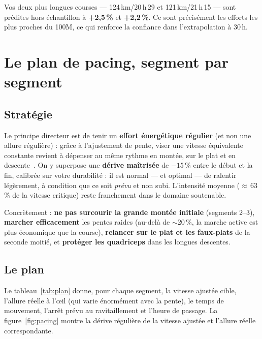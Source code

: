\documentclass{locomotionreport}
\begin{document}
\begin{llexemple}
Vos deux plus longues courses --- 124\,km/20\,h\,29 et 121\,km/21\,h\,15 --- sont pr\'edites hors \'echantillon \`a
\textbf{+2,5\,\%} et \textbf{+2,2\,\%}. Ce sont pr\'ecis\'ement les efforts les plus proches du 100M, ce qui renforce
la confiance dans l'extrapolation \`a 30\,h.
\end{llexemple}

\section{Le plan de pacing, segment par segment}

\subsection{Strat\'egie}
Le principe directeur est de tenir un \textbf{effort \'energ\'etique r\'egulier} (et non une allure r\'eguli\`ere) :
gr\^ace \`a l'ajustement de pente, viser une vitesse \'equivalente constante revient \`a d\'epenser au m\^eme rythme
en mont\'ee, sur le plat et en descente~\cite{swain1997}. On y superpose une \textbf{d\'erive ma\^itris\'ee} de
\(-15\,\%\) entre le d\'ebut et la fin, calibr\'ee sur votre durabilit\'e : il est normal --- et optimal --- de
ralentir l\'eg\`erement, \`a condition que ce soit \emph{pr\'evu} et non subi. L'intensit\'e moyenne ($\approx$\,63\,\%
de la vitesse critique) reste franchement dans le domaine soutenable.

Concr\`etement : \textbf{ne pas surcourir la grande mont\'ee initiale} (segments 2--3), \textbf{marcher efficacement}
les pentes raides (au-del\`a de $\sim$20\,\%, la marche active est plus \'economique que la course), \textbf{relancer
sur le plat et les faux-plats} de la seconde moiti\'e, et \textbf{prot\'eger les quadriceps} dans les longues descentes.

\subsection{Le plan}
Le tableau~\ref{tab:plan} donne, pour chaque segment, la vitesse ajust\'ee cible, l'allure r\'eelle \`a l'\oe il
(qui varie \'enorm\'ement avec la pente), le temps de mouvement, l'arr\^et pr\'evu au ravitaillement et l'heure de
passage. La figure~\ref{fig:pacing} montre la d\'erive r\'eguli\`ere de la vitesse ajust\'ee et l'allure r\'eelle
correspondante.
\end{document}
